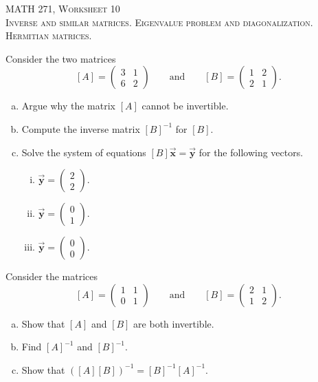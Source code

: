 \documentclass[12pt]{article} %
\begin{document}
\begin{center}
   \textsc{\large MATH 271, Worksheet 10}\\
   \textsc{Inverse and similar matrices. Eigenvalue problem and diagonalization. Hermitian matrices.}
\end{center}
\vspace{.5cm}


\begin{problem}
Consider the two matrices 
\[
[A] = \begin{pmatrix} 3 & 1 \\ 6 & 2 \end{pmatrix} \qquad \textrm{and} \qquad [B] = \begin{pmatrix} 1 & 2\\ 2 & 1 \end{pmatrix}.
\]
\begin{enumerate}[(a)]
    \item Argue why the matrix $[A]$ cannot be invertible. 
    \item Compute the inverse matrix $[B]^{-1}$ for $[B]$.  
    \item Solve the system of equations $[B]\vec{\boldsymbol{x}} = \vec{\boldsymbol{y}}$ for the following vectors.
    \begin{enumerate}[i.]
        \item $\vec{\boldsymbol{y}} = \begin{pmatrix} 2 \\ 2 \end{pmatrix}$.
        \item $\vec{\boldsymbol{y}} = \begin{pmatrix} 0 \\ 1 \end{pmatrix}$.
        \item $\vec{\boldsymbol{y}} = \begin{pmatrix} 0 \\ 0 \end{pmatrix}$.
    \end{enumerate}
\end{enumerate}
\end{problem}

\begin{problem}
Consider the matrices 
\[
[A] = \begin{pmatrix} 1 & 1 \\ 0 & 1 \end{pmatrix} \qquad \textrm{and} \qquad [B] = \begin{pmatrix} 2 & 1 \\ 1 & 2 \end{pmatrix}.
\]
\begin{enumerate}[(a)]
    \item Show that $[A]$ and $[B]$ are both invertible.
    \item Find $[A]^{-1}$ and $[B]^{-1}$.
    \item Show that $([A][B])^{-1} = [B]^{-1} [A]^{-1}$.
\end{enumerate}
\end{problem}
\end{document}

